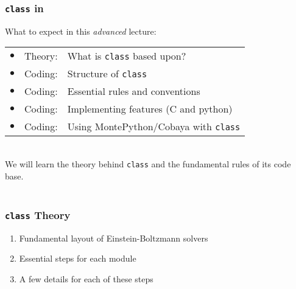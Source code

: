






\scriptsize

\begin{frame}[fragile]
\frametitle{{\tt \Red class} in \location}

\mbox{}
What to expect in this {\itshape advanced} lecture:
\vspace*{0.5\baselineskip}\mbox{}
\bgroup 
\def\arraystretch{1.15}
\begin{tabular}{lll}
	$\bullet$&Theory:& What is {\Red \tt class} based upon?\\
	$\bullet$&Coding:& Structure of {\Red \tt class}\\
	$\bullet$&Coding:& Essential rules and conventions\\
	$\bullet$&Coding:& Implementing features (C and python)\\
	$\bullet$&Coding:& Using MontePython/Cobaya with {\Red \tt class}
\end{tabular}
\egroup

\mbox{}\\
We will learn {\Red the theory behind \tt class} and the fundamental rules of its {\Red code base}.\\\mbox{}\\

\end{frame}

\begin{frame}[fragile]
\frametitle{{\tt \Red class} Theory}

\begin{enumerate}
	\item Fundamental layout of Einstein-Boltzmann solvers
	\item Essential steps for each module
	\item A few details for each of these steps
\end{enumerate}

\end{frame}

